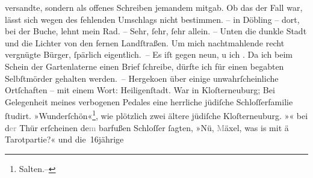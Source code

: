 \begin{ledgroupsized}[t]{13cm}
{{{                  versandte, sondern als offenes Schreiben jemandem mitgab. Ob das der Fall war,
                  lässt sich wegen des fehlenden Umschlags nicht bestimmen.}}}\label{K_L02960-1h} – in Döbling – dort, bei der Buche, lehnt mein Rad. –
               Sehr, ſehr, ſehr allein. – Unten die dunkle Stadt und die Lichter von den fernen Landſtraßen. Um mich
               nachtmahlende recht vergnügte Bürger, ſpärlich eigentlich. – Es iſt gegen
                  neun, u ich \label{K_L02960-2v}\label{K_L02960-2h}. Da ich beim Schein der Gartenlaterne {\pb}einen Brief ſchreibe, dürfte ich für einen
               begabten Selbſtmörder gehalten werden. – Hergeko{\geminationm}en über
               einige unwahrſcheinliche Ortſchaften – mit einem Wort: Heiligenſtadt. War in Kloſterneuburg;
               Bei Gelegenheit meines verbogenen Pedales eine herrliche jüdiſche Schloſſerfamilie
                  {\pb}ſtudirt. »Wunderſchön«\footnote{\noindent{}Salten.–}, wie plötzlich zwei ältere jüdiſche Kloſterneuburg. »\label{K_L02960-3v}\label{K_L02960-3h}« bei
                  d\textcolor{gray}{er} Thür erſcheinen {\kaufmannsund}
                  de\textcolor{gray}{m}
               barfußen Schloſſer ſagten, »Nü,
                  \textcolor{gray}{M}äxel, was is mit ä Tarotpartie?« und die 16jährige \label{K_L02960-4v}
\end{ledgroupsized}
